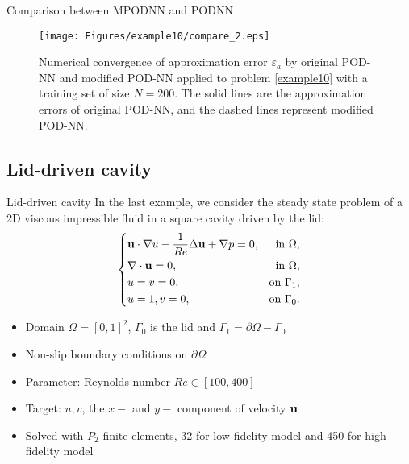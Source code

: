 \documentclass[10pt]{beamer}
\begin{document}
\begin{frame}{Comparison between MPODNN and PODNN}
\begin{figure}[htbp]
    \centering
    \vbox{
    \texttt{[image: Figures/example10/compare\_2.eps]}
    }
    \caption{Numerical convergence of approximation error $\varepsilon_a$ by original POD-NN and modified POD-NN applied to problem \eqref{example10} with a training set of  size $N=200$.  The solid lines are the approximation errors of original POD-NN, and the dashed lines represent modified POD-NN.}
    \label{example10-comparison}
\end{figure}
\end{frame}


\subsection{Lid-driven cavity}
\begin{frame}{Lid-driven cavity}
In the last example, we consider the steady state problem of a 2D viscous impressible fluid in a square cavity driven by the lid:
\begin{equation}
\label{example13-equation}    
\left\{
\begin{aligned}
&{\bf u}\cdot \nabla u - \frac{1}{Re} \Delta {\bf u}  + \nabla p = 0, &\text{in}\ \Omega, \\
&\nabla \cdot {\bf u} = 0, &\text{in}\ \Omega, \\
&u = v = 0, &\text{on}\ \Gamma_1, \\
&u = 1, v = 0, &\text{on}\ \Gamma_0.
\end{aligned}
\right.
\end{equation}
\begin{itemize}
	\item Domain $\Omega = [0, 1]^2 $, $\Gamma_0 $ is the lid and $\Gamma_1 = \partial\Omega - \Gamma_0 $
	\item Non-slip boundary conditions on $\partial \Omega$
	\item Parameter: Reynolds number $Re \in [100, 400]$
	\item Target: $u, v$, the $x-$ and $y-$ component of velocity ${\bf u}$
	\item Solved with $P_2 $ finite elements, 32 for low-fidelity model and 450 for high-fidelity model
\end{itemize}
\end{frame}
\end{document}

